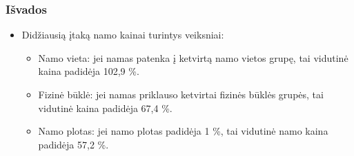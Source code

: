 \documentclass[utf8,hyperref={unicode}]{beamer}
\theoremstyle{change}\newtheorem{teorema}{Teiginys}
\theoremstyle{change}\newtheorem{salyga}{}
\begin{document}
\begin{frame}
    \frametitle{Išvados}  
    \begin{itemize}
	\large \item Didžiausią įtaką namo kainai turintys veiksniai: 
                      \begin{itemize}
	            \item  Namo vieta: jei namas patenka į ketvirtą namo vietos grupę, tai vidutinė kaina padidėja 102,9 \%.
                        \item Fizinė būklė: jei namas priklauso ketvirtai fizinės būklės grupės, tai vidutinė kaina padidėja 67,4 \%.	
                       \item Namo plotas: jei namo plotas padidėja 1 \%, tai vidutinė namo kaina padidėja 57,2 \%.
                   \end{itemize}

\end{itemize}
\end{frame}
\end{document}
